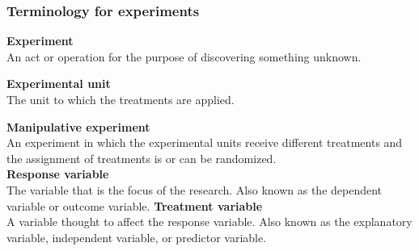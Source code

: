 \documentclass[color=usenames,dvipsnames]{beamer}\usepackage[]{graphicx}\usepackage[]{color}
\begin{document}



\begin{frame}
  \frametitle{Terminology for experiments}
  \small
  {\bf Experiment} \\
  An act or operation for the purpose of discovering something
  unknown. \par
  \pause
  \vfill %
  {\bf Experimental unit} \\
  The unit to which the treatments are applied. \par
  \pause
  \vfill %
  {\bf Manipulative experiment} \\
  An experiment in which the experimental units receive different
  treatments and the assignment of treatments is or can be randomized. \\
  \pause
  \vfill
  {\bf Response variable } \\
  The variable that is the focus of the research. Also known as the
  dependent variable or outcome variable.
  \pause
  \vfill
  {\bf Treatment variable } \\
  A variable thought to affect the response variable. Also known as the 
  explanatory variable, independent variable, or predictor variable.
\end{frame}
\end{document}
